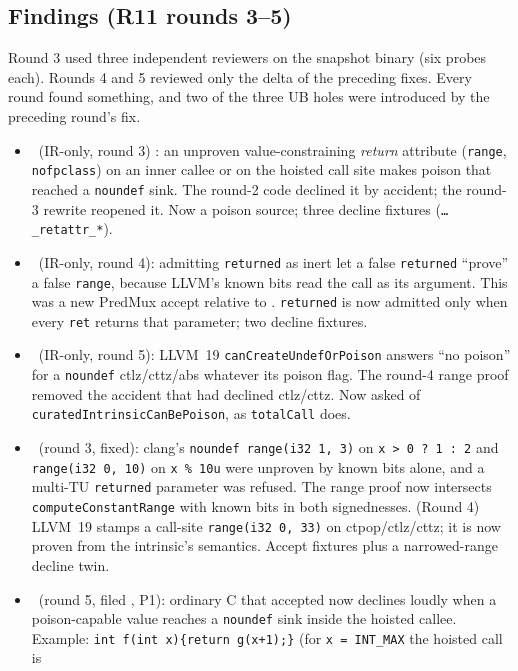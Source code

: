 \subsection*{Findings (R11 rounds 3--5)}
Round 3 used three independent reviewers on the snapshot binary (six probes each).
Rounds 4 and 5 reviewed only the delta of the preceding fixes. Every round found
something, and two of the three UB holes were introduced by the preceding round's fix.
\begin{itemize}
\item \fconfirmed\ (IR-only, round 3) : an unproven value-constraining
\emph{return} attribute (\texttt{range}, \texttt{nofpclass}) on an inner callee
or on the hoisted call site makes poison that reached a \texttt{noundef} sink. The
round-2 code declined it by accident; the round-3 rewrite reopened it. Now a poison
source; three decline fixtures (\texttt{\dots\_retattr\_*}).
\item \fconfirmed\ (IR-only, round 4): admitting \texttt{returned} as inert let a
false \texttt{returned} ``prove'' a false \texttt{range}, because LLVM's known bits
read the call as its argument. This was a new PredMux accept relative to
. \texttt{returned} is now admitted only when every \texttt{ret}
returns that parameter; two decline fixtures.
\item \fconfirmed\ (IR-only, round 5): LLVM~19 \texttt{canCreateUndefOrPoison}
answers ``no poison'' for a \texttt{noundef} ctlz/cttz/abs whatever its poison flag.
The round-4 range proof removed the accident that had declined ctlz/cttz. Now
asked of \texttt{curatedIntrinsicCanBePoison}, as \texttt{totalCall} does.
\item \foverdecline\ (round 3, fixed): clang's \texttt{noundef range(i32 1, 3)}
on \texttt{x > 0 ? 1 : 2} and \texttt{range(i32 0, 10)} on \texttt{x \% 10u}
were unproven by known bits alone, and a multi-TU \texttt{returned} parameter was
refused. The range proof now intersects \texttt{computeConstantRange} with known
bits in both signednesses. (Round 4) LLVM~19 stamps a call-site
\texttt{range(i32 0, 33)} on ctpop/ctlz/cttz; it is now proven from the
intrinsic's semantics. Accept fixtures plus a narrowed-range decline twin.
\item \foverdecline\ (round 5, filed , P1): ordinary C that
 accepted now declines loudly when a poison-capable value reaches
a \texttt{noundef} sink inside the hoisted callee. Example:
\texttt{int f(int x)\{return g(x+1);\}} (for \texttt{x = INT\_MAX} the hoisted call is

\end{itemize}
